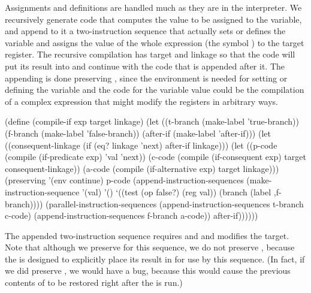 Assignments and definitions are handled much as they are in the interpreter.
We recursively generate code that computes the value to be assigned to the
variable, and append to it a two-instruction sequence that actually sets or
defines the variable and assigns the value of the whole expression (the symbol
) to the target register.  The recursive compilation has target
 and linkage  so that the code will put its result into
 and continue with the code that is appended after it.  The appending
is done preserving , since the environment is needed for setting or
defining the variable and the code for the variable value could be the
compilation of a complex expression that might modify the registers in
arbitrary ways.

\begin{codeBlock}
(define (compile-if exp target linkage)
  (let ((t-branch (make-label 'true-branch))
        (f-branch (make-label 'false-branch))
        (after-if (make-label 'after-if)))
    (let ((consequent-linkage
            (if (eq? linkage 'next)
                after-if
                linkage)))
      (let ((p-code
              (compile (if-predicate exp)
                       'val
                       'next))
            (c-code
              (compile
                (if-consequent exp)
                target
                consequent-linkage))
            (a-code
              (compile (if-alternative exp)
                       target
                       linkage)))
        (preserving
          '(env continue)
          p-code
          (append-instruction-sequences
            (make-instruction-sequence
              '(val) '()
              `((test (op false?) (reg val))
                (branch (label ,f-branch))))
            (parallel-instruction-sequences
              (append-instruction-sequences
                t-branch c-code)
              (append-instruction-sequences
                f-branch a-code))
            after-if))))))
\end{codeBlock}

\noindent
The appended two-instruction sequence requires  and  and
modifies the target.  Note that although we preserve  for this
sequence, we do not preserve , because the  is
designed to explicitly place its result in  for use by this sequence.
(In fact, if we did preserve , we would have a bug, because this
would cause the previous contents of  to be restored right after the
 is run.)


